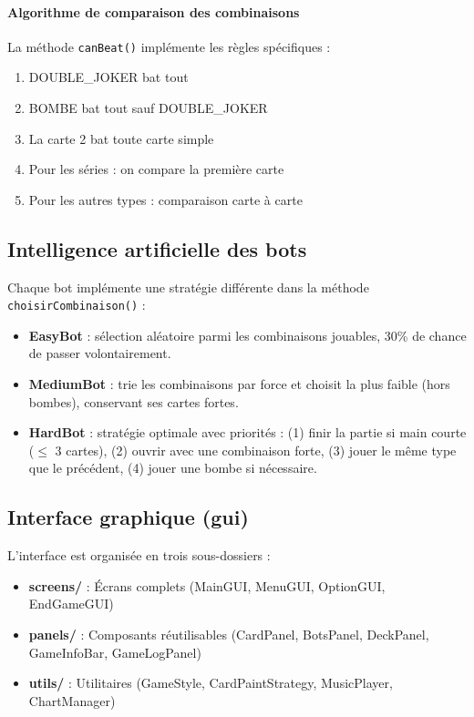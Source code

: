 \paragraph{Algorithme de comparaison des combinaisons}
La méthode \texttt{canBeat()} implémente les règles spécifiques :
\begin{enumerate}
\item DOUBLE\_JOKER bat tout
\item BOMBE bat tout sauf DOUBLE\_JOKER
\item La carte 2 bat toute carte simple
\item Pour les séries : on compare la première carte
\item Pour les autres types : comparaison carte à carte
\end{enumerate}

\subsection{Intelligence artificielle des bots}
Chaque bot implémente une stratégie différente dans la méthode \texttt{choisirCombinaison()} :

\begin{itemize}
\item \textbf{EasyBot} : sélection aléatoire parmi les combinaisons jouables, 30\% de chance de passer volontairement.
\item \textbf{MediumBot} : trie les combinaisons par force et choisit la plus faible (hors bombes), conservant ses cartes fortes.
\item \textbf{HardBot} : stratégie optimale avec priorités : (1) finir la partie si main courte ($\le$ 3 cartes), (2) ouvrir avec une combinaison forte, (3) jouer le même type que le précédent, (4) jouer une bombe si nécessaire.
\end{itemize}

\subsection{Interface graphique (gui)}
L'interface est organisée en trois sous-dossiers :

\begin{itemize}
\item \textbf{screens/} : Écrans complets (MainGUI, MenuGUI, OptionGUI, EndGameGUI)
\item \textbf{panels/} : Composants réutilisables (CardPanel, BotsPanel, DeckPanel, GameInfoBar, GameLogPanel)
\item \textbf{utils/} : Utilitaires (GameStyle, CardPaintStrategy, MusicPlayer, ChartManager)
\end{itemize}

